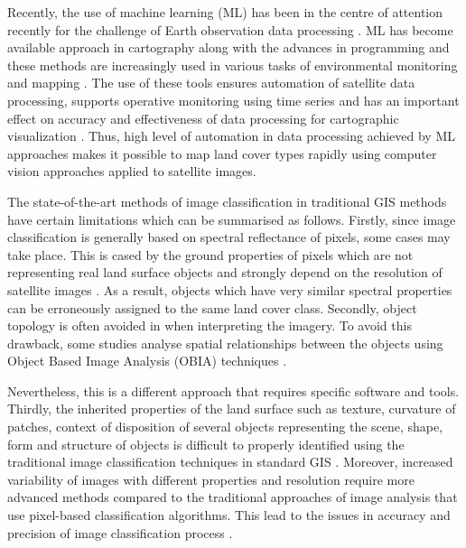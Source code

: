 \documentclass{elektr}
\begin{document}
Recently, the use of machine learning (ML) has been in the centre of attention recently for the challenge of Earth observation data processing \cite{9395808,10041606,Lemenkova202320,8547145}. ML has become available approach in cartography along with the advances in programming and these methods are increasingly used in various tasks of environmental monitoring and mapping \cite{10142835,jimaging9050098,9850602}. The use of these tools ensures automation of satellite data processing, supports operative monitoring using time series and has an important effect on accuracy and effectiveness of data processing for cartographic visualization \cite{jmse12081279}. Thus, high level of automation in data processing achieved by ML approaches makes it possible to map land cover types rapidly using computer vision approaches applied to satellite images.

The state-of-the-art methods of image classification in traditional GIS methods have certain limitations which can be summarised as follows. Firstly, since image classification is generally based on spectral reflectance of pixels, some cases may take place. This is cased by the ground properties of pixels which are not representing real land surface objects and strongly depend on the resolution of satellite images \cite{6351712,Lemenkova202322}. As a result, objects which have very similar spectral properties can be erroneously assigned to the same land cover class. Secondly, object topology is often avoided in when interpreting the imagery. To avoid this drawback, some studies analyse spatial relationships between the objects using Object Based Image Analysis (OBIA) techniques \cite{LUCIANO2019127,PHIRI2018170,DEWALI20233109,MAO202011}. 

Nevertheless, this is a different approach that requires specific software and tools. Thirdly, the inherited properties of the land surface such as texture, curvature of patches, context of disposition of several objects representing the scene, shape, form and structure of objects is difficult to properly identified using the traditional image classification techniques in standard GIS \cite{OUSMANOU2024100239,ZHANG2023129590,BAKR2010592}. Moreover, increased variability of images with different properties and resolution require more advanced methods compared to the traditional approaches of image analysis that use pixel-based classification algorithms. This lead to the issues in accuracy and precision of image classification process \cite{Fisher,McKee}.
\end{document}
